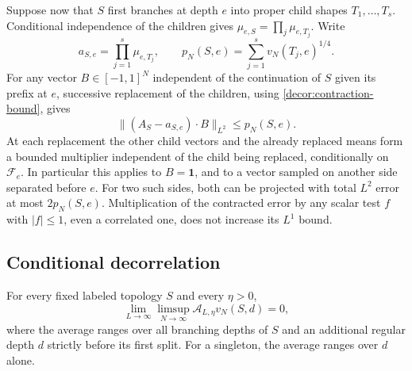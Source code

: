 Suppose now that $S$ first branches at depth $e$ into proper child shapes
$T_1,\ldots,T_s$. Conditional independence of the children gives
$\mu_{e,S}=\prod_j\mu_{e,T_j}$. Write
\begin{equation}
 a_{S,e}=\prod_{j=1}^s \mu_{e,T_j},
 \qquad p_N(S,e)=\sum_{j=1}^s v_N(T_j,e)^{1/4}.
 \label{decor:projection-definition}
\end{equation}
For any vector $B\in[-1,1]^N$ independent of the continuation of $S$
given its prefix at $e$, successive replacement of the children,
using \eqref{decor:contraction-bound}, gives
\begin{equation}
 \|(A_S-a_{S,e})\cdot B\|_{L^2}\le p_N(S,e).
 \label{decor:projection-bound}
\end{equation}
At each replacement the other child vectors and the already replaced
means form a bounded multiplier independent of the child being
replaced, conditionally on $\mathscr F_e$.  In particular this applies
to $B=\mathbf1$, and to a vector sampled on another side separated
before $e$.  For two such sides, both can be projected with total
$L^2$ error at most $2p_N(S,e)$.  Multiplication of the contracted
error by any scalar test $f$ with $|f|\le1$, even a correlated one,
does not increase its $L^1$ bound.

\subsection{Conditional decorrelation}

\begin{proposition}
\label{decor:conditional-concentration}
For every fixed labeled topology $S$ and every $\eta>0$,
\begin{equation}
 \lim_{L\to\infty}\limsup_{N\to\infty}
       \mathcal A_{L,\eta}v_N(S,d)=0,
 \label{decor:conditional-concentration-equation}
\end{equation}
where the average ranges over all branching depths of $S$ and an
additional regular depth $d$ strictly before its first split.  For a
singleton, the average ranges over $d$ alone.
\end{proposition}

